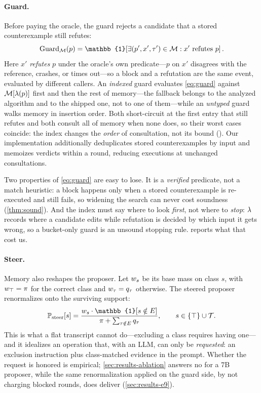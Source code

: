 \paragraph{Guard.}
Before paying the oracle, the guard rejects a candidate that a stored
counterexample still refutes:
\begin{equation}
\mathrm{Guard}_\mem(p) = \mathbb{1}\!\left[\exists (p', x', \tau') \in \mem :
x' \text{ refutes } p\right].
\label{eq:guard}
\end{equation}
Here $x'$ \emph{refutes} $p$ under the oracle's own predicate---$p$ on $x'$
disagrees with the reference, crashes, or times out---so a block and a
refutation are the same event, evaluated by different callers.
An \emph{indexed} guard evaluates \cref{eq:guard} against $\mathcal{M}[\lambda(p)]$ first
and then the rest of memory---the fallback belongs to the analyzed algorithm
and to the shipped one, not to one of them---while an \emph{untyped} guard
walks memory in insertion order. Both short-circuit at the first entry that still refutes and both
consult all of memory when none does, so their worst cases coincide: the index
changes the \emph{order} of consultation, not its bound (\Rguardcost). Our
implementation additionally deduplicates stored counterexamples by input and
memoizes verdicts within a round, reducing executions at unchanged
consultations.

Two properties of \cref{eq:guard} are easy to lose. It is a \emph{verified}
predicate, not a match heuristic: a block happens only when a stored
counterexample is re-executed and still fails, so widening the search can never
cost soundness (\cref{thm:sound}). And the index must say where to look
\emph{first}, not where to \emph{stop}: $\lambda$ records where a candidate edits
while refutation is decided by which input it gets wrong, so a bucket-only
guard is an unsound stopping rule.  reports what that cost us.

\paragraph{Steer.}
Memory also reshapes the proposer. Let $w_s$ be its base mass on class
$s$, with $w_\top = \pi$ for the correct class and $w_\tau = q_\tau$
otherwise. The steered proposer renormalizes onto the surviving support:
\begin{equation}
\mathbb{P}_{\mathrm{steer}}[s] =
\frac{\wmass_s \cdot \mathbb{1}[s \notin \elim]}
     {\pi + \sum_{\tau \notin \elim} q_\tau},
\qquad s \in \{\top\} \cup \types .
\label{eq:steer}
\end{equation}
This is what a flat transcript cannot do---excluding a class requires having
one---and it idealizes an operation that, with an LLM, can only be
\emph{requested}: an exclusion instruction plus class-matched evidence in the
prompt. Whether the request is honored is empirical;
\cref{sec:results-ablation} answers no for a 7B proposer, while the same
renormalization applied on the guard side, by not charging blocked rounds, does
deliver (\cref{sec:results-e9}).

